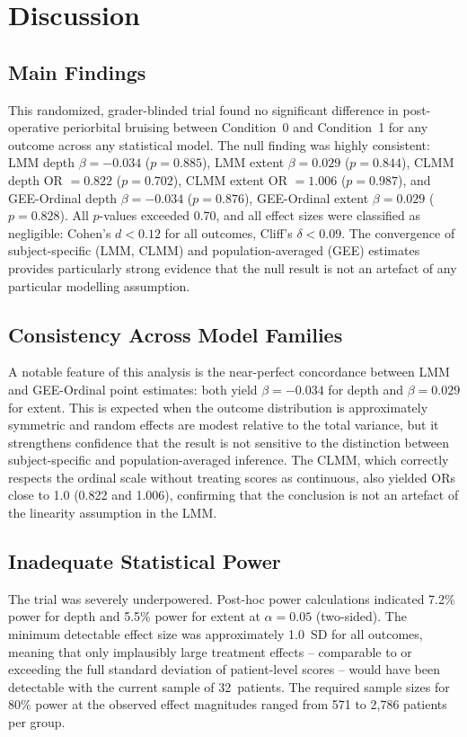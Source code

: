 \section{Discussion}

\subsection{Main Findings}

This randomized, grader-blinded trial found no significant difference in post-operative periorbital bruising between Condition~0 and Condition~1 for any outcome across any statistical model. The null finding was highly consistent: LMM depth $\beta = -0.034$ ($p = 0.885$), LMM extent $\beta = 0.029$ ($p = 0.844$), CLMM depth OR $= 0.822$ ($p = 0.702$), CLMM extent OR $= 1.006$ ($p = 0.987$), and GEE-Ordinal depth $\beta = -0.034$ ($p = 0.876$), GEE-Ordinal extent $\beta = 0.029$ ($p = 0.828$). All $p$-values exceeded 0.70, and all effect sizes were classified as negligible: Cohen's $d < 0.12$ for all outcomes, Cliff's $\delta < 0.09$. The convergence of subject-specific (LMM, CLMM) and population-averaged (GEE) estimates provides particularly strong evidence that the null result is not an artefact of any particular modelling assumption.

\subsection{Consistency Across Model Families}

A notable feature of this analysis is the near-perfect concordance between LMM and GEE-Ordinal point estimates: both yield $\beta = -0.034$ for depth and $\beta = 0.029$ for extent. This is expected when the outcome distribution is approximately symmetric and random effects are modest relative to the total variance, but it strengthens confidence that the result is not sensitive to the distinction between subject-specific and population-averaged inference. The CLMM, which correctly respects the ordinal scale without treating scores as continuous, also yielded ORs close to 1.0 (0.822 and 1.006), confirming that the conclusion is not an artefact of the linearity assumption in the LMM.

\subsection{Inadequate Statistical Power}

The trial was severely underpowered. Post-hoc power calculations indicated 7.2\% power for depth and 5.5\% power for extent at $\alpha = 0.05$ (two-sided). The minimum detectable effect size was approximately 1.0~SD for all outcomes, meaning that only implausibly large treatment effects -- comparable to or exceeding the full standard deviation of patient-level scores -- would have been detectable with the current sample of 32~patients. The required sample sizes for 80\% power at the observed effect magnitudes ranged from 571 to 2{,}786 patients per group.

